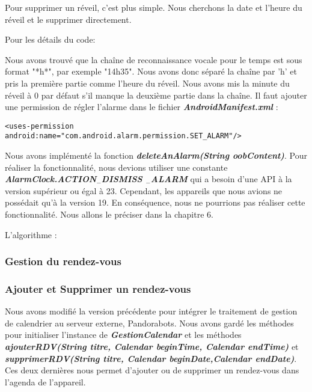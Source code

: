 \indent Pour supprimer un réveil, c'est plus simple. Nous cherchons la date et l'heure du réveil et le supprimer directement.

\indent Pour les détails du code: 

\indent Nous avons trouvé que la chaîne de reconnaissance vocale pour le temps est sous format "*h*", par exemple "14h35". Nous avons donc séparé la chaîne par 'h' et pris la première partie comme l'heure du réveil. Nous avons mis la minute du réveil à 0 par défaut s'il manque la deuxième partie dans la chaîne. Il faut ajouter une permission de régler l'alarme dans le fichier \textbf{\emph{AndroidManifest.xml}} : \\
	\begin{lstlisting}[frame=none,aboveskip=-0.5em,basicstyle=\footnotesize\bfseries]
	<uses-permission android:name="com.android.alarm.permission.SET_ALARM"/>
	\end{lstlisting}

\indent Nous avons implémenté la fonction \textbf{\emph{deleteAnAlarm(String oobContent)}}. Pour réaliser la fonctionnalité, nous devions utiliser une constante \textbf{\emph{AlarmClock.ACTION$_-$DISMISS $_-$ALARM}} qui a besoin d'une API à la version supérieur ou égal à 23. Cependant, les appareils que nous avions ne possédait qu'à la version 19. En conséquence, nous ne pourrions pas réaliser cette fonctionnalité. Nous allons le préciser dans la chapitre 6.

\indent L'algorithme :\\



\subsubsection{Gestion du rendez-vous}

\subsubsection*{Ajouter et Supprimer un rendez-vous}

\indent Nous avons modifié la version précédente pour intégrer le traitement de gestion de calendrier au serveur externe, Pandorabots. Nous avons gardé les méthodes pour initialiser l'instance de \textbf{\emph{GestionCalendar}} et les méthodes \textbf{\emph{ajouterRDV(String titre, Calendar beginTime, Calendar endTime)}} et \textbf{\emph{supprimerRDV(String titre, Calendar beginDate,Calendar endDate)}}. Ces deux dernières nous permet d'ajouter ou de supprimer un rendez-vous dans l'agenda de l'appareil.


